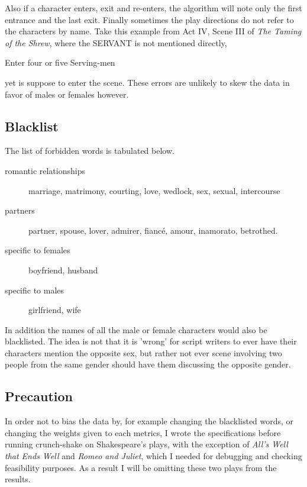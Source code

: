 \documentclass[12pt]{article}
\begin{document}
Also if a character enters, exit and re-enters, the algorithm will note only
the first entrance and the last exit. Finally sometimes the play directions do
not refer to the characters by name. Take this example from Act IV, Scene III
of \emph{The Taming of the Shrew}, where the SERVANT is not mentioned directly,
\begin{displayquote}
Enter four or five Serving-men
\end{displayquote}
yet is suppose to enter the scene. These errors are unlikely to skew the data
in favor of males or females however.

\subsection{Blacklist}
\label{sub:blacklist}

The list of forbidden words is tabulated below. 
\begin{description}
    \item[romantic relationships] marriage,
        matrimony, courting, love, wedlock, sex, sexual, intercourse
    \item[partners] partner, spouse, lover,
        admirer, fiancé, amour, inamorato, betrothed. 
    \item[specific to females] boyfriend, husband
    \item[specific to males] girlfriend, wife
\end{description}

In addition the names of all the male or female characters would also be
blacklisted. The idea is not that it is 'wrong' for script writers to ever have
their characters mention the opposite sex, but rather not ever scene involving
two people from the same gender should have them discussing the opposite
gender.

\subsection{Precaution}
\label{sub:Precautions}

In order not to bias the data by, for example changing the blacklisted words,
or changing the weights given to each metrics, I wrote the specifications
before running crunch-shake on Shakespeare's plays, with the exception of
\emph{All's Well that Ends Well} and \emph{Romeo and Juliet}, which I needed
for debugging and checking feasibility purposes. As a result I will be omitting
these two plays from the results. 
\end{document}

